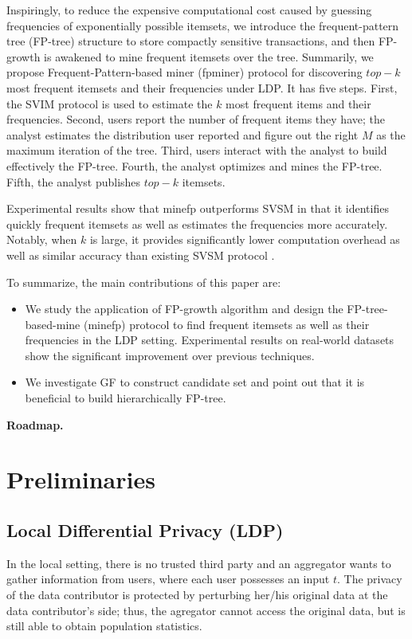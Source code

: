 \documentclass[conference]{IEEEtran}
\begin{document}
Inspiringly, to reduce the expensive computational cost caused by guessing frequencies of exponentially possible itemsets, we introduce the frequent-pattern tree (FP-tree)\cite{fp} structure to store compactly sensitive transactions, and then FP-growth\cite{fp} is awakened to mine frequent itemsets over the tree. Summarily, we propose {\color{red}Frequent-Pattern-based miner (fpminer)} protocol for discovering $top-k$ most frequent itemsets and their frequencies under LDP. {\color{red}It has five steps. First, the SVIM protocol is used to estimate the $k$ most frequent items and their frequencies. Second, users report the number of frequent items they have; the analyst estimates the distribution user reported and figure out the right $M$ as the maximum iteration of the tree. Third, users interact with the analyst to build effectively the FP-tree\cite{fp}. Fourth, the analyst optimizes and mines the FP-tree. Fifth, the analyst publishes $top-k$ itemsets.}

Experimental results show that {\color{red}minefp outperforms SVSM in that it identifies quickly frequent itemsets as well as estimates the frequencies more accurately. Notably, when $k$ is large, it provides significantly lower computation overhead as well as similar accuracy than existing SVSM protocol .}

{\color{red}
To summarize, the main contributions of this paper are:
\begin{itemize}
\item We study the application of FP-growth algorithm and design the FP-tree-based-mine (minefp) protocol to find frequent itemsets as well as their frequencies in the LDP setting. Experimental results on real-world datasets show the significant improvement over previous techniques.
\item We investigate GF to construct candidate set and point out that it is beneficial to build hierarchically FP-tree. 
\end{itemize}
}


\textbf{Roadmap.}

\section{Preliminaries}
\subsection{Local Differential Privacy (LDP)}
In the local setting, there is no trusted third party and an aggregator wants to gather information from users, where each user possesses an input $t$. The privacy of the data contributor is protected by perturbing her/his original data at the data contributor’s side; thus, the agregator cannot access the original data, but is still able to obtain population statistics.
\end{document}
